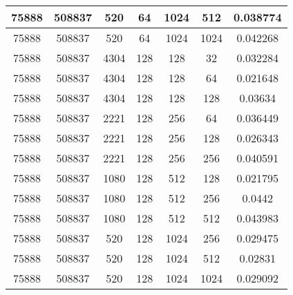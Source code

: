 \documentclass[9pt]{article}
\begin{document}
\begin{tabular}{|c|c|c|c|c|c|c| }
\hline
75888  & 508837  & 520  & 64  & 1024  & 512  & 0.038774 \\
\hline
75888  & 508837  & 520  & 64  & 1024  & 1024  & 0.042268 \\
\hline
75888  & 508837  & 4304  & 128  & 128  & 32  & 0.032284 \\
\hline
75888  & 508837  & 4304  & 128  & 128  & 64  & 0.021648 \\
\hline
75888  & 508837  & 4304  & 128  & 128  & 128  & 0.03634 \\
\hline
75888  & 508837  & 2221  & 128  & 256  & 64  & 0.036449 \\
\hline
75888  & 508837  & 2221  & 128  & 256  & 128  & 0.026343 \\
\hline
75888  & 508837  & 2221  & 128  & 256  & 256  & 0.040591 \\
\hline
75888  & 508837  & 1080  & 128  & 512  & 128  & 0.021795 \\
\hline
75888  & 508837  & 1080  & 128  & 512  & 256  & 0.0442 \\
\hline
75888  & 508837  & 1080  & 128  & 512  & 512  & 0.043983 \\
\hline
75888  & 508837  & 520  & 128  & 1024  & 256  & 0.029475 \\
\hline
75888  & 508837  & 520  & 128  & 1024  & 512  & 0.02831 \\
\hline
75888  & 508837  & 520  & 128  & 1024  & 1024  & 0.029092 \\
\hline
\end{tabular}
 
\end{document}
